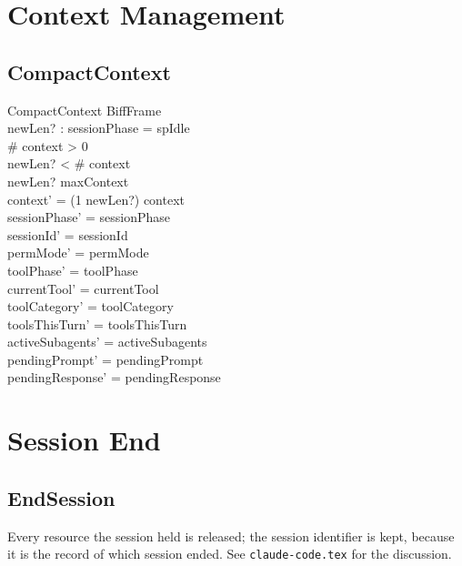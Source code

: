 \documentclass[a4paper,10pt,fleqn]{article}
\begin{document}
\section{Context Management}

\subsection{CompactContext}

\begin{schema}{CompactContext}
  BiffFrame \\
  newLen? : \nat
  \where
  sessionPhase = spIdle \\
  \# context > 0 \\
  newLen? < \# context \\
  newLen? \leq maxContext \\
  context' = (1 \upto newLen?) \dres context \\
  sessionPhase' = sessionPhase \\
  sessionId' = sessionId \\
  permMode' = permMode \\
  toolPhase' = toolPhase \\
  currentTool' = currentTool \\
  toolCategory' = toolCategory \\
  toolsThisTurn' = toolsThisTurn \\
  activeSubagents' = activeSubagents \\
  pendingPrompt' = pendingPrompt \\
  pendingResponse' = pendingResponse
\end{schema}

\section{Session End}

\subsection{EndSession}

Every resource the session held is released; the session identifier is
kept, because it is the record of which session ended. See
\texttt{claude-code.tex} for the discussion.
\end{document}
